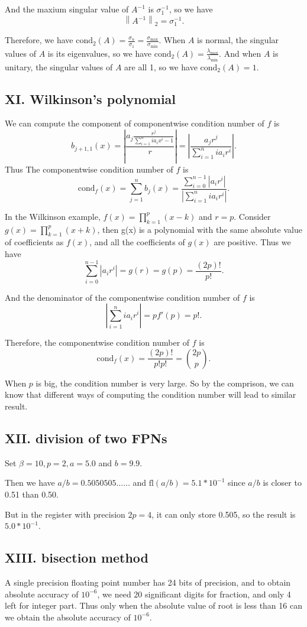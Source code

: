 \documentclass[a4paper]{article}
\newcommand{\fl}{\text{fl}}
\newcommand{\abs}[1]{\left|#1\right|}
\newcommand{\normtwo}[1]{\left\|#1\right\|_2}
\begin{document}
And the maxium singular value of $A^{-1}$ is $\sigma_1^{-1}$, so we have
\[
  \normtwo{A^{-1}} = \sigma_1^{-1}.
\]

Therefore, we have $\text{cond}_2(A) = \frac{\sigma_n}{\sigma_1} = \frac{\sigma_{\max}}{\sigma_{\min}}$. When $A$ is normal, the singular values of $A$ is its eigenvalues, so we have $\text{cond}_2(A) = \frac{\lambda_{\max}}{\lambda_{\min}}$. And when $A$ is unitary, the singular values of $A$ are all 1, so we have $\text{cond}_2(A) = 1$.
\subsection*{XI. Wilkinson's polynomial}
We can compute the component of componentwise condition number of $f$ is\[
b_{j+1,1}(x) = \abs{\frac{a_j\frac{r^j}{\sum_{i =1}^{n}ia_ix^i-1}}{r}}=\abs{\frac{a_jr^j}{\sum_{i =1}^{n}ia_ir^i}}.
\]  
Thus The componentwise condition number of $f$ is \[
\text{cond}_{f}(x) = \sum_{j=1}^{n}b_{j}(x) = \dfrac{\sum_{i = 0}^{n-1}\abs{a_i r^i}}{\abs{\sum_{i =1}^{n}ia_ir^i}}.
\]

In the Wilkinson example, $f(x) = \prod_{k=1}^{p}(x-k)$ and $r = p$. Consider $g(x) = \prod_{k = 1}^{p} (x+k)$,
then g(x) is a polynomial with the same absolute value of coefficients as $f(x)$, and all the coefficients of $g(x)$ are positive. Thus we have \[\sum_{i = 0}^{n-1}\abs{a_i r^i} = g(r) = g(p) = \frac{(2p)!}{p!}.\]

And the denominator of the componentwise condition number of $f$ is \[\abs{\sum_{i =1}^{n}ia_ir^i} = pf'(p) =  p!.\]

Therefore, the componentwise condition number of $f$ is \[\text{cond}_{f}(x) = \frac{(2p)!}{p!p!} = \binom{2p}{p}.\]

When $p$ is big, the condition number is very large. So by the comprison, we can know that different ways of computing the condition number will lead to similar result.

\subsection*{XII. division of two FPNs}
Set $\beta = 10, p = 2, a = 5.0$ and $b = 9.9$. 

Then we have $a / b = 0.5050505……$ and $\fl(a/b) = 5.1 * 10^{-1}$ since $a/b$ is closer to 0.51 than 0.50.

But in the register with precision $2p = 4$, it can only store 0.505, so the result is $5.0 * 10^{-1}$.
\subsection*{XIII. bisection method}
A single precision floating point number has 24 bits of precision, and to obtain absolute accuracy of $10^{-6}$, we need 20 significant digits for fraction, and only 4 left for integer part. Thus only when the absolute value of root is less than 16 can we obtain the absolute accuracy of $10^{-6}$.
\end{document}
